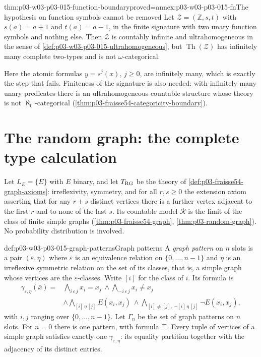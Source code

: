 \begin{hbtheorem}{thm:p03-w03-p03-015-function-boundary}{proved=annex:p03-w03-p03-015-fn}{The hypothesis on function symbols cannot be removed}
Let \(\mathcal Z=(\mathbb Z,s,t)\) with \(s(a)=a+1\) and \(t(a)=a-1\),
in the finite signature with two unary function symbols and nothing else.
Then \(\mathcal Z\) is countably infinite and ultrahomogeneous in the
sense of \cref{def:p03-w03-p03-015-ultrahomogeneous}, but
\(\operatorname{Th}(\mathcal Z)\) has infinitely many complete two-types
and is not \(\omega\)-categorical.
\end{hbtheorem}

Here the atomic formulas \(y=s^j(x)\), \(j\geq0\), are infinitely many,
which is exactly the step that fails. Finiteness of the signature is also
needed: with infinitely many unary predicates there is an ultrahomogeneous
countable structure whose theory is not \(\aleph_0\)-categorical
(\cref{thm:p03-fraisse54-categoricity-boundary}).

\section{The random graph: the complete type calculation}
\label{sec:p03-w03-p03-015-random-graph}

Let \(L_E=\{E\}\) with \(E\) binary, and let \(T_{\rm RG}\) be the theory
of \cref{def:p03-fraisse54-graph-axioms}: irreflexivity, symmetry, and for
all \(r,s\geq0\) the extension axiom asserting that for any \(r+s\)
distinct vertices there is a further vertex adjacent to the first \(r\)
and to none of the last \(s\). Its countable model \(\mathcal R\) is the
limit of the class of finite simple graphs (\cref{thm:p03-fraisse54-graph},
\cref{thm:p03-random-graph}). No probability distribution is involved.

\begin{hbdefinition}{def:p03-w03-p03-015-graph-patterns}{Graph patterns}
A \emph{graph pattern} on \(n\) slots is a pair \((\varepsilon,\eta)\)
where \(\varepsilon\) is an equivalence relation on
\(\{0,\ldots,n-1\}\) and \(\eta\) is an irreflexive symmetric relation on
the set of its classes, that is, a simple graph whose vertices are the
\(\varepsilon\)-classes. Write \([i]\) for the class of \(i\). Its formula is
\[
 \begin{aligned}
 \gamma_{\varepsilon,\eta}(\bar x)={}&
 \bigwedge_{i\,\varepsilon\,j}x_i=x_j\ \land
 \bigwedge_{\neg\,i\,\varepsilon\,j}x_i\neq x_j\\
 &\land\bigwedge_{[i]\,\eta\,[j]}E(x_i,x_j)\ \land
 \bigwedge_{[i]\neq[j],\ \neg[i]\,\eta\,[j]}\neg E(x_i,x_j),
 \end{aligned}
\]
with \(i,j\) ranging over \(\{0,\ldots,n-1\}\). Let \(\Gamma_n\) be the
set of graph patterns on \(n\) slots. For \(n=0\) there is one pattern,
with formula \(\top\). Every tuple of vertices of a simple graph
satisfies exactly one \(\gamma_{\varepsilon,\eta}\): its equality
partition together with the adjacency of its distinct entries.
\end{hbdefinition}

